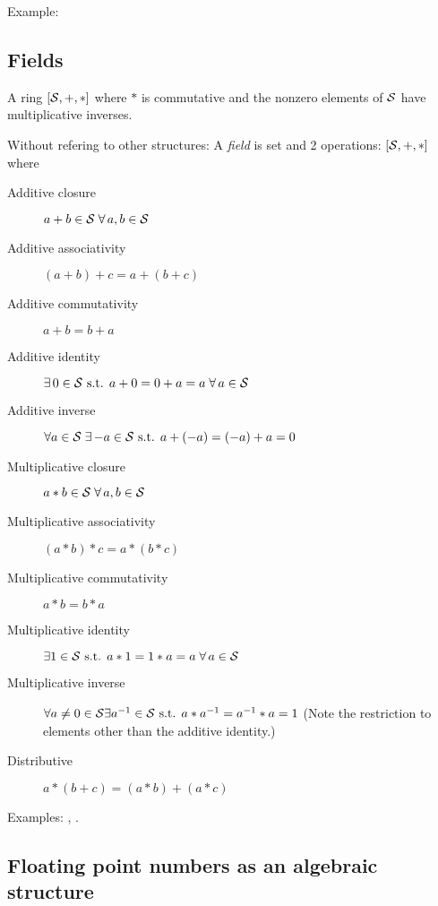 Example:

\subsection{Fields}
\label{sec:Fields}
\cite{wiki:Field-mathematics}

A ring $\left[ {\mathcal{S}}, +, * \right]$ where
$*$ is commutative and the nonzero elements of ${\mathcal{S}}$
have multiplicative inverses.

Without refering to other structures:
A \textit{field} is set and 2 operations: 
$\left[ {\mathcal{S}}, +, * \right]$
where
\begin{description}
  \item[Additive closure] $a + b \in {\mathcal{S}} \; 
  \forall \, a,b \in {\mathcal{S}}$ 
  \item[Additive associativity] 
  $\left( a + b \right) + c = a + \left( b + c \right)$ 
  \item[Additive commutativity] $a + b = b + a$ 
  \item[Additive identity] $\exists \, 0 \in {\mathcal{S}} \text{ s.t. } 
  a + 0 = 0 + a = a \; \forall \, a \in {\mathcal{S}}$ 
  \item[Additive inverse] $\forall a \in {\mathcal{S}} \; 
  \exists \, {-a} \in {\mathcal{S}} 
  \text{ s.t. }  a + \left( -a \right) = \left( -a \right) + a = 0$ 
  \item[Multiplicative closure] $a * b \in {\mathcal{S}} \; \forall \,a,b \in {\mathcal{S}}$ 
  \item[Multiplicative associativity] 
  $\left( a * b \right) * c = a * \left( b * c \right)$ 
  \item[Multiplicative commutativity] $a * b = b * a$ 
  \item[Multiplicative identity] $\exists 1 \in {\mathcal{S}}
   \text{ s.t. } 
  a * 1 = 1 * a = a \; \forall \, a \in {\mathcal{S}}$ 
  \item[Multiplicative inverse] $\forall a \ne 0 \in {\mathcal{S}} 
  \exists a^{-1} \in {\mathcal{S}}
  \text{ s.t. }  a * a^{-1} = a^{-1} * a = 1$ 
  (Note the restriction to elements other than the additive identity.) 
  \item[Distributive] $a * \left( b + c \right) 
  = \left( a * b \right) + \left( a * c \right)$
\end{description}


Examples: 
, .

\subsection{Floating point numbers as an algebraic structure}

